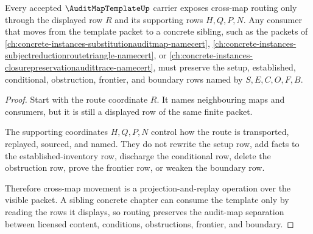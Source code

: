 \begin{theorem}
\label{thm:audit-map-template-cross-map-routing}
Every accepted $\AuditMapTemplateUp$ carrier exposes cross-map routing only through the displayed row $R$ and its supporting rows $H,Q,P,N$. Any consumer that moves from the template packet to a concrete sibling, such as the packets of \autoref{ch:concrete-instances-substitutionauditmap-namecert}, \autoref{ch:concrete-instances-subjectreductionroutetriangle-namecert}, or \autoref{ch:concrete-instances-closurepreservationaudittrace-namecert}, must preserve the setup, established, conditional, obstruction, frontier, and boundary rows named by $S,E,C,O,F,B$.
\end{theorem}
\begin{proof}
Start with the route coordinate $R$. It names neighbouring maps and consumers, but it is still a displayed row of the same finite packet.

The supporting coordinates $H,Q,P,N$ control how the route is transported, replayed, sourced, and named. They do not rewrite the setup row, add facts to the established-inventory row, discharge the conditional row, delete the obstruction row, prove the frontier row, or weaken the boundary row.

Therefore cross-map movement is a projection-and-replay operation over the visible packet. A sibling concrete chapter can consume the template only by reading the rows it displays, so routing preserves the audit-map separation between licensed content, conditions, obstructions, frontier, and boundary.
\end{proof}

\begin{closurestatus}{\AuditMapTemplateUp}
  \theoryclosure{\seedClosure}
  \formalstatus{\unformalizedV}
\end{closurestatus}
